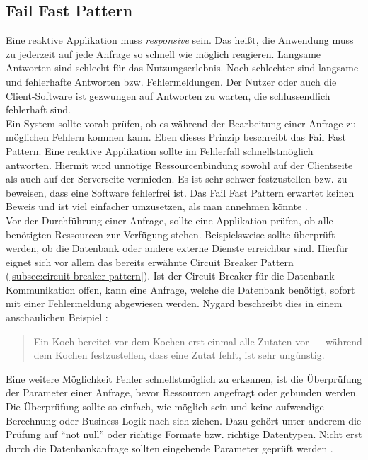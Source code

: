 \pagebreak

\subsection{Fail Fast Pattern}
Eine reaktive Applikation muss \textit{responsive} sein. Das heißt, die Anwendung muss zu jederzeit auf jede Anfrage so schnell wie möglich reagieren. Langsame Antworten sind schlecht für das Nutzungserlebnis. Noch schlechter sind langsame und fehlerhafte Antworten bzw. Fehlermeldungen. Der Nutzer oder auch die Client-Software ist gezwungen auf Antworten zu warten, die schlussendlich fehlerhaft sind.\\
Ein System sollte vorab prüfen, ob es während der Bearbeitung einer Anfrage zu möglichen Fehlern kommen kann. Eben dieses Prinzip beschreibt das Fail Fast Pattern. Eine reaktive Applikation sollte im Fehlerfall schnellstmöglich antworten. Hiermit wird unnötige Ressourcenbindung sowohl auf der Clientseite als auch auf der Serverseite vermieden. Es ist sehr schwer festzustellen bzw. zu beweisen, dass eine Software fehlerfrei ist. Das Fail Fast Pattern erwartet keinen Beweis und ist viel einfacher umzusetzen, als man annehmen könnte \cite[S.~106~\&~S.~107]{nygard_release_2007}.\\
Vor der Durchführung einer Anfrage, sollte eine Applikation prüfen, ob alle benötigten Ressourcen zur Verfügung stehen. Beispielsweise sollte überprüft werden, ob die Datenbank oder andere externe Dienste erreichbar sind. Hierfür eignet sich vor allem das bereits erwähnte Circuit Breaker Pattern (\ref{subsec:circuit-breaker-pattern}). Ist der Circuit-Breaker für die Datenbank-Kommunikation offen, kann eine Anfrage, welche die Datenbank benötigt, sofort mit einer Fehlermeldung abgewiesen werden. Nygard beschreibt dies in einem anschaulichen Beispiel \cite[S.~106]{nygard_release_2007}:

\begin{quotation}
Ein Koch bereitet vor dem Kochen erst einmal alle Zutaten vor --- während dem Kochen festzustellen, dass eine Zutat fehlt, ist sehr ungünstig.
\end{quotation}

Eine weitere Möglichkeit Fehler schnellstmöglich zu erkennen, ist die Überprüfung der Parameter einer Anfrage, bevor Ressourcen angefragt oder gebunden werden. Die Überprüfung sollte so einfach, wie möglich sein und keine aufwendige Berechnung oder Business Logik nach sich ziehen. Dazu gehört unter anderem die Prüfung auf \enquote{not null} oder richtige Formate bzw. richtige Datentypen. Nicht erst durch die Datenbankanfrage sollten eingehende Parameter geprüft werden \cite[S.~107]{nygard_release_2007}.\\

